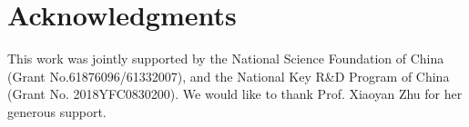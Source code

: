 \documentclass[letterpaper]{article} \usepackage{aaai19}  \usepackage{times}  \usepackage{helvet}  \usepackage{courier}  \usepackage{url}  \usepackage{graphicx}  \usepackage{amssymb}
\begin{document}
\section{Acknowledgments}

This work was jointly supported by the National Science Foundation of China  (Grant No.61876096/61332007), and
the National Key R\&D Program of China (Grant No. 2018YFC0830200). We would like to thank Prof. Xiaoyan Zhu for her generous support.


 
\end{document}
